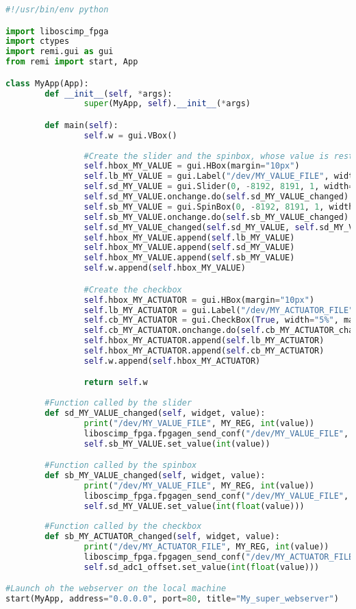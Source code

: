 \documentclass[12pt,oneside]{article}
\begin{document}
\vspace{-0.2cm}
\begin{lstlisting}[language=Python]
#!/usr/bin/env python

import liboscimp_fpga
import ctypes
import remi.gui as gui
from remi import start, App

class MyApp(App):
		def __init__(self, *args):
				super(MyApp, self).__init__(*args)

		def main(self):
				self.w = gui.VBox()
				
				#Create the slider and the spinbox, whose value is restricted to -8192 to 8191 (no overflow)
				self.hbox_MY_VALUE = gui.HBox(margin="10px")
				self.lb_MY_VALUE = gui.Label("/dev/MY_VALUE_FILE", width="20%", margin="50px")
				self.sd_MY_VALUE = gui.Slider(0, -8192, 8191, 1, width="60%", margin="10px")
				self.sd_MY_VALUE.onchange.do(self.sd_MY_VALUE_changed)
				self.sb_MY_VALUE = gui.SpinBox(0, -8192, 8191, 1, width="20%", margin="10px")
				self.sb_MY_VALUE.onchange.do(self.sb_MY_VALUE_changed)
				self.sd_MY_VALUE_changed(self.sd_MY_VALUE, self.sd_MY_VALUE.get_value())
				self.hbox_MY_VALUE.append(self.lb_MY_VALUE)
				self.hbox_MY_VALUE.append(self.sd_MY_VALUE)
				self.hbox_MY_VALUE.append(self.sb_MY_VALUE)
				self.w.append(self.hbox_MY_VALUE)

				#Create the checkbox
				self.hbox_MY_ACTUATOR = gui.HBox(margin="10px")
				self.lb_MY_ACTUATOR = gui.Label("/dev/MY_ACTUATOR_FILE", width="20%", margin="50px")
				self.cb_MY_ACTUATOR = gui.CheckBox(True, width="5%", margin="10px")
				self.cb_MY_ACTUATOR.onchange.do(self.cb_MY_ACTUATOR_changed)
				self.hbox_MY_ACTUATOR.append(self.lb_MY_ACTUATOR)
				self.hbox_MY_ACTUATOR.append(self.cb_MY_ACTUATOR)
				self.w.append(self.hbox_MY_ACTUATOR)

				return self.w
		
		#Function called by the slider
		def sd_MY_VALUE_changed(self, widget, value):
				print("/dev/MY_VALUE_FILE", MY_REG, int(value))
				liboscimp_fpga.fpgagen_send_conf("/dev/MY_VALUE_FILE", MY_REG, int(value))
				self.sb_MY_VALUE.set_value(int(value))

		#Function called by the spinbox
		def sb_MY_VALUE_changed(self, widget, value):
				print("/dev/MY_VALUE_FILE", MY_REG, int(value))
				liboscimp_fpga.fpgagen_send_conf("/dev/MY_VALUE_FILE", MY_REG, int(value))
				self.sd_MY_VALUE.set_value(int(float(value)))
				
		#Function called by the checkbox
		def sb_MY_ACTUATOR_changed(self, widget, value):
				print("/dev/MY_ACTUATOR_FILE", MY_REG, int(value))
				liboscimp_fpga.fpgagen_send_conf("/dev/MY_ACTUATOR_FILE", MY_REG2, int(value))
				self.sd_adc1_offset.set_value(int(float(value)))

#Launch oh the webserver on the local machine
start(MyApp, address="0.0.0.0", port=80, title="My_super_webserver")
\end{lstlisting}
\end{document}
